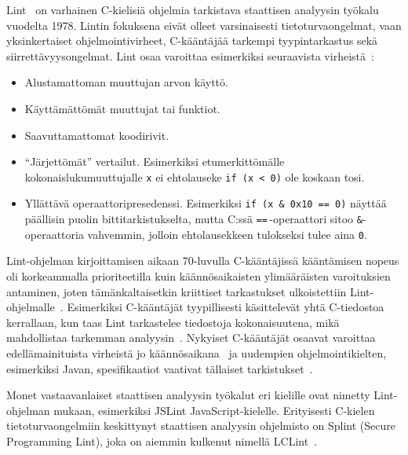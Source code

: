 
Lint~\cite{Lint} on varhainen C-kielisiä ohjelmia tarkistava staattisen analyysin työkalu vuodelta 1978.
Lintin fokuksena eivät olleet varsinaisesti tietoturvaongelmat,
vaan yksinkertaiset ohjelmointivirheet, C-kääntäjää tarkempi tyypintarkastus sekä siirrettävyysongelmat.
Lint osaa varoittaa esimerkiksi seuraavista virheistä~\cite{Lint}:

\begin{itemize}
    \item Alustamattoman muuttujan arvon käyttö.
    \item Käyttämättömät muuttujat tai funktiot.
    \item Saavuttamattomat koodirivit.
    \item ``Järjettömät'' vertailut.
           Esimerkiksi etumerkittömälle kokonaislukumuuttujalle \texttt{x} ei ehtolauseke
           \texttt{if (x < 0)} ole koskaan tosi.
   \item Yllättävä operaattoripresedenssi.
         Esimerkiksi \texttt{if (x \& 0x10 == 0)} näyttää päällisin puolin bittitarkistukselta,
         mutta C:ssä \texttt{==}\,-operaattori sitoo \texttt{\&}-operaattoria vahvemmin,
         jolloin ehtolausekkeen tulokseksi tulee aina \texttt{0}.
\end{itemize}

Lint-ohjelman kirjoittamisen aikaan 70-luvulla C-kääntäjissä kääntämisen nopeus oli
korkeammalla prioriteetilla kuin käännösaikaisten ylimääräisten varoituksien antaminen,
joten tämänkaltaisetkin kriittiset tarkastukset ulkoistettiin Lint-ohjelmalle~\cite{Lint}.
Esimerkiksi C-kääntäjät tyypillisesti käsittelevät yhtä C-tiedostoa kerrallaan,
kun taas Lint tarkastelee tiedostoja kokonaisuutena,
mikä mahdollistaa tarkemman analyysin~\cite{Lint}.
Nykyiset C-kääntäjät osaavat varoittaa e\-del\-lä\-mai\-ni\-tuis\-ta virheistä
jo käännösaikana~\cite{SecurityRootOfTheProblem} ja uudempien ohjelmointikielten,
esimerkiksi Javan, spesifikaatiot vaativat tällaiset tarkistukset~\cite[22.3]{Sommerville}.

Monet vastaavanlaiset staattisen analyysin työkalut eri kielille ovat nimetty
Lint-ohjelman mukaan, esimerkiksi JSLint JavaScript-kielelle.
Erityisesti C-kielen tietoturvaongelmiin keskittynyt staattisen analyysin ohjelmisto on Splint
(Secure Programming Lint), joka on aiemmin kulkenut nimellä LCLint~\cite{SplintLCLint}.

